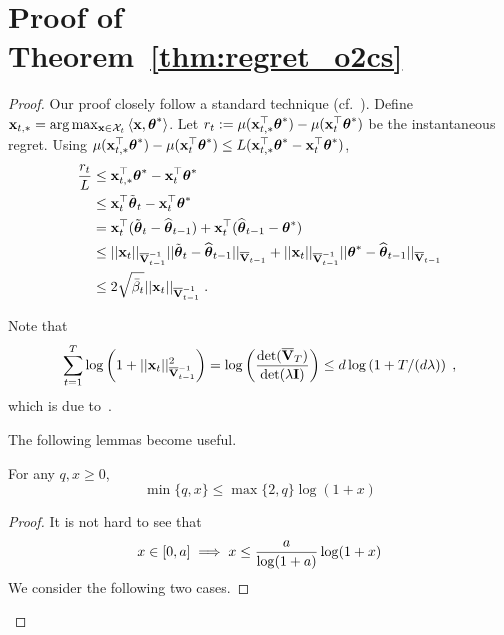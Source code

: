 \section{Proof of Theorem~\ref{thm:regret_o2cs}}
\vspace{-5pt}
\begin{proof}
  Our proof closely follow a standard technique (cf.~\citet{ay11improved}).
  Define $\x_{t,*} = \arg\max_{\x\in\cX_t} \la\x,\th^*\ra$.
  Let $r_t := \mu(\x_{t,*}^\T \th^*) - \mu(\x_t^\T\th^*)$ be the instantaneous regret.
  Using $\mu(\x_{t,*}^\T \th^*) - \mu(\x_t^\T\th^*) \le L(\x_{t,*}^\T \th^* - \x_t^\T\th^*)$,
  \begin{equation*}\begin{aligned}
      \fr{r_t}{L} &\le \x_{t,*}^\T \th^* - \x_t^\T\th^*
  \\&\le \x_t^\T\tilth_t - \x_t^\T\th^*
  \\&=   \x_t^\T(\tilth_t - \hth_{t-1}) + \x_t^\T(\hth_{t-1} - \th^*)
  \\&\le ||\x_t||_{\ibarV_{t-1}} || \tilth_t - \hth_{t-1} ||_{\barV_{t-1}} + ||\x_t||_{\ibarV_{t-1}} || \th^* - \hth_{t-1} ||_{\barV_{t-1}}
  \\&\le 2\sqrt{\bar\beta_t}||\x_t||_{\ibarV_{t-1}} \;.
  \end{aligned}\end{equation*}

  Note that
  \begin{equation}\begin{aligned}
  \sum_{t=1}^T \log\lt(1+ ||\x_t||^2_{\ibarV_{t-1}}\rt) 
     =   \log\lt(\fr{\det(\barV_T)}{\det(\lam \I)}\rt) 
     \le d \log\lt( 1+T/(d\lam)\rt) \;, \label{eq:bound_log_1_x}
  \end{aligned}\end{equation}
  which is due to~\citet[Lemma 11]{ay11improved}. 

The following lemmas become useful.
\begin{lem}\label{lem:x_logx}
  For any $q, x \ge 0$,
  $$\min \{q, x\} \le \max\{2, q\} \log (1+x)$$
\end{lem}
\begin{proof}
  It is not hard to see that
\begin{equation}\begin{aligned} \label{x_logx_bound} 
    x \in [0,a] \implies x \le \fr{a}{\log(1+a)} \log(1+x)
\end{aligned}\end{equation}
  We consider the following two cases.


\end{proof}
\end{proof}
